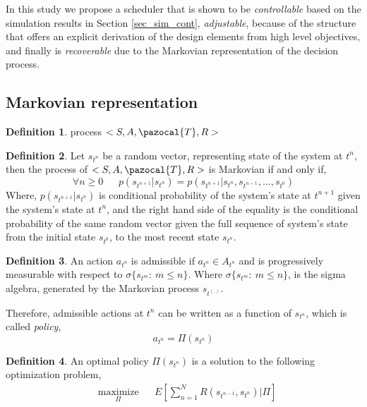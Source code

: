 \documentclass[12pt]{article}
\theoremstyle{definition}
\newtheorem{defn}{Definition}
\begin{document}
In this study we propose a scheduler that is shown to be \textit{controllable} based on the simulation results in Section \ref{sec_sim_cont}, \textit{adjustable}, because of the structure that offers an explicit derivation of the design elements from high level objectives, and finally is \textit{recoverable} due to the Markovian representation of the decision process.

\subsection{Markovian representation}
\begin{defn} 
process  $<S, A, \pazocal{T}, R>$
\end{defn}

\begin{defn} 
Let $s_{t^n}$ be a random vector, representing state of the system at $t^n$, then the process of  $<S, A, \pazocal{T}, R>$  is Markovian if and only if,\\
\begin{equation*}
\forall n\geq 0 ~~~~~~~p(s_{t^{n+1}} | s_{t^n}) = p(s_{t^{n+1}} | s_{t^n}, s_{t^{n-1}},\dots, s_{t^0})  
\end{equation*}
Where, $p(s_{t^{n+1}} | s_{t^n})$  is conditional probability of the system's state at $t^{n+1}$ given the system's state at $t^n$, and the right hand side of the equality is the conditional probability of the same random vector given the full sequence of system's state from the initial state $s_{t^0}$, to the most recent state $s_{t^n}$.
\end{defn}

\begin{defn}
An action $a_{t^n}$ is admissible if $a_{t^n} \in A_{t^n}$ and is progressively measurable with respect to $\sigma\{s_{t^m}:~m \leq n\}$. Where $\sigma\{s_{t^m}:~m \leq n\}$, is the sigma algebra, generated by the Markovian process $s_{t^{(.)}}$.
\end{defn}

Therefore, admissible actions at $t^n$ can be written as a function of $s_{t^n}$, which is called \textit{policy},
\begin{equation*}
a_{t^n} = \Pi(s_{t^n})
\end{equation*}

\begin{defn}
An optimal policy $\Pi(s_{t^n})$ is a solution to the following optimization problem,
\begin{equation}\label{equ_opt1}
\begin{aligned}
& \underset{\Pi}{\text{maximize}}
& & E[\sum_{n=1}^{N} R(s_{t^{n-1}}, s_{t^n}) | \Pi] 
\end{aligned}
\end{equation}
\end{defn}
\end{document}
